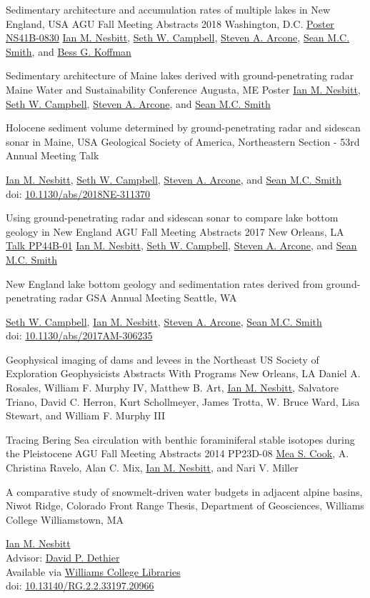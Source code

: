 \documentclass[a4paper,12pt,sans,colorlinks]{moderncv}
\newcommand{\me}{\href{https://www.iannesbitt.org}{Ian M. Nesbitt}}
\newcommand{\seth}{\href{https://www.alpinesciences.net}{Seth W. Campbell}}
\newcommand{\sean}{\href{https://umaine.edu/earthclimate/people/sean-m-c-smith/}{Sean M.C. Smith}}
\newcommand{\bess}{\href{https://www.colby.edu/directory/profile/bess.koffman/}{Bess G. Koffman}}
\newcommand{\stevearcone}{\href{https://engineering.dartmouth.edu/community/faculty/steven-arcone}{Steven A. Arcone}}
\newcommand{\mea}{\href{https://geosciences.williams.edu/profile/msc1/}{Mea S. Cook}}
\newcommand{\david}{\href{https://geosciences.williams.edu/profile/ddethier/}{David P. Dethier}}
\newcommand{\agunola}{\href{https://agu.confex.com/agu/fm17/meetingapp.cgi/Paper/260265}{Talk PP44B-01}}
\newcommand{\agudc}{\href{https://agu.confex.com/agu/fm18/meetingapp.cgi/Paper/449070}{Poster NS41B-0830}}
\newcommand{\williamsthesis}{\href{https://unbound.williams.edu/theses/islandora/object/studenttheses:766}{Williams College Libraries}}
\newcommand{\doi}[1]{%
    \href{https://doi.org/#1}{#1}
}
\begin{document}
{Sedimentary architecture and accumulation rates of
multiple lakes in New England, USA}
{AGU Fall Meeting Abstracts 2018}
{Washington, D.C.}
{\agudc}
{
    \me{}, \seth{}, \stevearcone{}, \sean{}, and \bess{}
}

{Sedimentary architecture of Maine lakes derived
with ground-penetrating radar}
{Maine Water and Sustainability Conference}
{Augusta, ME}
{Poster}
{
    \me{}, \seth{}, \stevearcone{}, and \sean{}
}

{Holocene sediment volume determined by
ground-penetrating radar and sidescan sonar in Maine, USA}
{Geological Society of America, Northeastern Section - 53rd Annual Meeting}
{}
{Talk}
{
    \me{}, \seth{}, \stevearcone{}, and \sean{}
    \\
    doi: \doi{10.1130/abs/2018NE-311370}
}

{Using ground-penetrating radar and sidescan sonar to
compare lake bottom geology in New England}
{AGU Fall Meeting Abstracts 2017}
{New Orleans, LA}
{\agunola}
{
    \me{}, \seth{}, \stevearcone{}, and \sean{}
}

{New England lake bottom geology and sedimentation
rates derived from ground-penetrating radar}
{GSA Annual Meeting}
{Seattle, WA}
{}
{
    \seth{}, \me{}, \stevearcone{}, \sean{}
    \\
    doi: \doi{10.1130/abs/2017AM-306235}
}

{Geophysical imaging of dams and levees in the Northeast US}
{Society of Exploration Geophysicists Abstracts With Programs}
{New Orleans, LA}
{}
{Daniel A. Rosales, William F. Murphy IV, Matthew B. Art,
\me, Salvatore Triano, David C. Herron, Kurt Schollmeyer,
James Trotta, W. Bruce Ward, Lisa Stewart, and William F.
Murphy III}

{Tracing Bering Sea circulation with benthic
foraminiferal stable isotopes during the Pleistocene}
{AGU Fall Meeting Abstracts 2014}
{}
{PP23D-08}
{
    \mea{}, A. Christina Ravelo, Alan C. Mix, \me{},
    and Nari V. Miller
}

{A comparative study of snowmelt-driven water budgets in
adjacent alpine basins, Niwot Ridge, Colorado Front Range}
{Thesis, Department of Geosciences, Williams College}
{Williamstown, MA}
{}
{
    \me{}
    \\
    Advisor: \david
    \\
    Available via \williamsthesis
    \\
    doi: \doi{10.13140/RG.2.2.33197.20966}
}
\end{document}
